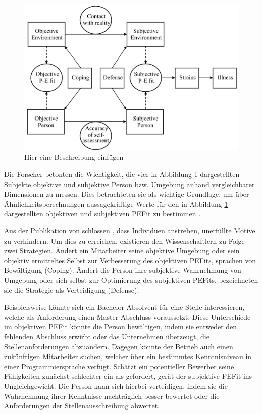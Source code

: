 \begin{figure}[h]
	\centering
	\includegraphics[width=1\textwidth]{gfx/subjektivObjektivPEFit.png}
	\caption{Hier eine Beschreibung einfügen \cite[S. 22]{edwards:2008}}
	\label{fig:personEnvironmentFit:subjektivObjektiv:abb1}
\end{figure}

Die Forscher betonten die Wichtigkeit, die vier in Abbildung \ref{fig:personEnvironmentFit:subjektivObjektiv:abb1} dargestellten Subjekte objektive und subjektive Person bzw. Umgebung anhand vergleichbarer Dimensionen zu messen. Dies betrachteten sie als wichtige Grundlage, um über Ähnlichkeitsberechnungen aussagekräftige Werte für den in Abbildung \ref{fig:personEnvironmentFit:subjektivObjektiv:abb1} dargestellten objektiven und subjektiven \ac{PEFit} zu bestimmen \cite[S. 2f.]{copingAndAdaption:1974}.

Aus der Publikation von \textcite[S. 10ff.]{french:1962} schlossen \textcite[S. 15]{copingAndAdaption:1974}, dass Individuen anstreben, unerfüllte Motive zu verhindern. Um dies zu erreichen, existieren den Wissenschaftlern zu Folge zwei Strategien. Ändert ein Mitarbeiter seine objektive Umgebung oder sein objektiv ermitteltes Selbst zur Verbesserung des objektiven \acp{PEFit}, sprachen \textcite[S. 15f.]{copingAndAdaption:1974} von Bewältigung (Coping). Ändert die Person ihre subjektive Wahrnehmung von Umgebung oder sich selbst zur Optimierung des subjektiven \acp{PEFit}, bezeichneten sie die Strategie als Verteidigung (Defense).

Beispielsweise könnte sich ein Bachelor-Absolvent für eine Stelle interessieren, welche als Anforderung einen Master-Abschluss voraussetzt. Diese Unterschiede im objektiven \ac{PEFit} könnte die Person bewältigen, indem sie entweder den fehlenden Abschluss erwirbt oder das Unternehmen überzeugt, die Stellenanforderungen abzuändern. Dagegen könnte der Betrieb auch einen zukünftigen Mitarbeiter suchen, welcher über ein bestimmtes Kenntnisniveau in einer Programmiersprache verfügt. Schätzt ein potentieller Bewerber seine Fähigkeiten zunächst schlechter ein als gefordert, gerät der subjektive \ac{PEFit} ins Ungleichgewicht. Die Person kann sich hierbei verteidigen, indem sie die Wahrnehmung ihrer Kenntnisse nachträglich besser bewertet oder die Anforderungen der Stellenausschreibung abwertet.

